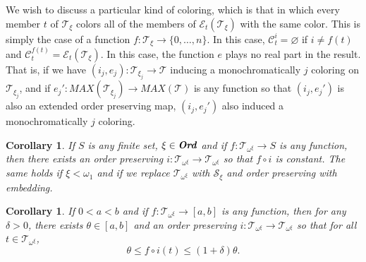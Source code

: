 \documentclass[12pt]{amsart}
\newtheorem{corollary}[theorem]{Corollary}
\theoremstyle{definition}
\newcommand{\ord}{\textbf{Ord}}
\newcommand{\ccc}{\mathcal{C}}
\newcommand{\eee}{\mathcal{E}}
\newcommand{\ttt}{\mathcal{T}}
\newcommand{\sss}{\mathcal{S}}
\begin{document}
We wish to discuss a particular kind of coloring, which is that in which every member $t$ of $\ttt_\xi$ colors all of the members of $\eee_t(\ttt_\xi)$ with the same color.  This is simply the case of a function $f:\ttt_\xi\to \{0, \ldots, n\}$.  In this case, $\ccc^i_t= \varnothing$ if $i\neq f(t)$ and $\ccc^{f(t)}_t= \eee_t(\ttt_\xi)$.  In this case, the function $e$ plays no real part in the result.  That is, if we have $(i_j, e_j):\ttt_{\xi_j}\to \ttt$ inducing a monochromatically $j$ coloring on $\ttt_{\xi_j}$, and if $e_j':MAX(\ttt_{\xi_j})\to MAX(\ttt)$ is any function so that $(i_j, e_j')$ is also an extended order preserving map, $(i_j, e_j')$ also induced a monochromatically $j$ coloring.  




\begin{corollary} If $S$ is any finite set, $\xi\in \emph{\ord}$ and if $f:\ttt_{\omega^\xi}\to S$ is any function, then there exists an order preserving $i:\ttt_{\omega^\xi}\to \ttt_{\omega^\xi}$ so that $f\circ i$ is constant.  The same holds if $\xi<\omega_1$ and if we replace $\ttt_{\omega^\xi}$ with $\sss_\xi$ and order preserving with embedding.  

\label{sum corollary}

\end{corollary}





\begin{corollary} If $0<a<b$ and if $f:\ttt_{\omega^\xi}\to [a,b]$ is any function, then for any $\delta>0$, there exists $\theta\in [a,b]$ and an order preserving $i:\ttt_{\omega^\xi}\to \ttt_{\omega^\xi}$ so that for all $t\in \ttt_{\omega^\xi}$, $$\theta\leqslant f\circ i(t)\leqslant (1+\delta)\theta.$$  

\label{approximate monochromatic}

\end{corollary}
\end{document}

